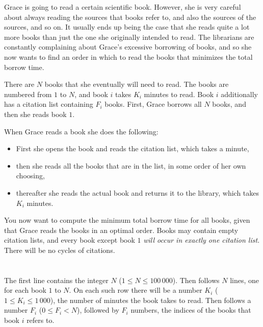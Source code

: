 
\def\version{jury-1}

Grace is going to read a certain scientific book.
However, she is very careful about always reading the sources that books refer
to, and also the sources of the sources, and so on.
It usually ends up being the case that she reads quite a lot more books than
just the one she originally intended to read.
The librarians are constantly complaining about Grace's excessive borrowing of
books, and so she now wants to find an order in which to read the books that
minimizes the total borrow time.

There are $N$ books that she eventually will need to read.
The books are numbered from $1$ to $N$, and book $i$ takes $K_i$ minutes to read.
Book $i$ additionally has a citation list containing $F_i$ books.
First, Grace borrows all $N$ books, and then she reads book $1$.

When Grace reads a book she does the following:

\begin{itemize}
\item First she opens the book and reads the citation list, which takes a minute,
\item then she reads all the books that are in the list, in some order of her own choosing,
\item thereafter she reads the actual book and returns it to the library, which takes $K_i$ minutes.
\end{itemize}

You now want to compute the minimum total borrow time for all books, given that Grace reads the books in an optimal order.
Books may contain empty citation lists, and every book except book $1$ {\em will occur in exactly one citation list}.
There will be no cycles of citations.

\section*{}
The first line contains the integer $N$ ($1 \le N \le 100\,000$).
Then follows $N$ lines, one for each book $1$ to $N$.
On each such row there will be a number $K_i$ ($1 \le K_i \le 1\,000$), the number of minutes the book takes to read.
Then follows a number $F_i$ ($0 \le F_i < N$), followed by $F_i$ numbers, the indices of the books that book $i$ refers to.

